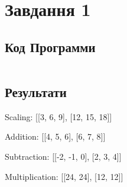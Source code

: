 \section{Завдання 1}
\label{sec:task1}

\subsection{Код Программи}
\label{subsec:task1_code}
\inputminted{python}{../src/task1.py}

\subsection{Результати}
\label{subsec:task1_results}

Scaling:
[[3, 6, 9], [12, 15, 18]]

Addition:
[[4, 5, 6], [6, 7, 8]]

Subtraction:
[[-2, -1, 0], [2, 3, 4]]

Multiplication:
[[24, 24], [12, 12]]
